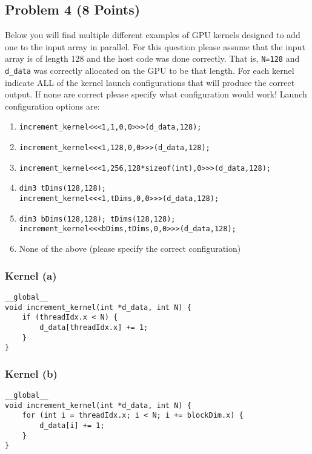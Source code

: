 \documentclass[]{article}
\begin{document}
\subsection*{Problem 4 (8 Points)}
Below you will find multiple different examples of GPU kernels designed to add one to the input array in parallel. For this question please assume that the input array is of length 128 and the host code was done correctly. That is, \texttt{N=128} and \texttt{d\_data} was correctly allocated on the GPU to be that length. For each kernel indicate ALL of the kernel launch configurations that will produce the correct output. If none are correct please specify what configuration would work!
Launch configuration options are:
\begin{enumerate}[label=\roman*]
    \item \texttt{increment\_kernel<<<1,1,0,0>>>(d\_data,128);}
    \item \texttt{increment\_kernel<<<1,128,0,0>>>(d\_data,128);}
    \item \texttt{increment\_kernel<<<1,256,128*sizeof(int),0>>>(d\_data,128);}
    \item \texttt{dim3 tDims(128,128);} \\ \texttt{increment\_kernel<<<1,tDims,0,0>>>(d\_data,128);}
    \item \texttt{dim3 bDims(128,128); tDims(128,128);} \\ \texttt{increment\_kernel<<<bDims,tDims,0,0>>>(d\_data,128);}
    \item None of the above (please specify the correct configuration)
\end{enumerate}

\subsubsection*{Kernel (a)}
\begin{lstlisting}
__global__
void increment_kernel(int *d_data, int N) {
    if (threadIdx.x < N) {
        d_data[threadIdx.x] += 1;
    }
}
\end{lstlisting}

\subsubsection*{Kernel (b)}
\begin{lstlisting}
__global__
void increment_kernel(int *d_data, int N) {
    for (int i = threadIdx.x; i < N; i += blockDim.x) {
        d_data[i] += 1;
    }
}
\end{lstlisting}
\end{document}
